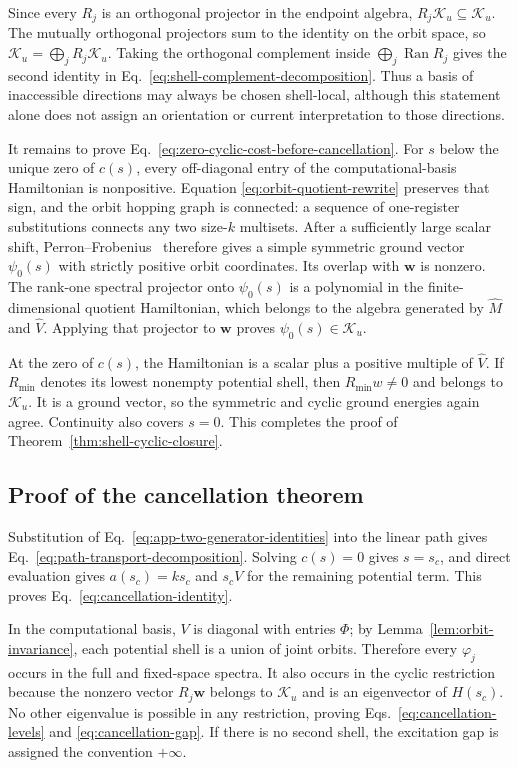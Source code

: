 Since every $R_j$ is an orthogonal projector in the endpoint algebra,
$R_j\mathcal K_u\subseteq\mathcal K_u$.  The mutually orthogonal projectors
sum to the identity on the orbit space, so
$\mathcal K_u=\bigoplus_jR_j\mathcal K_u$.  Taking the orthogonal complement
inside $\bigoplus_j\operatorname{Ran}R_j$ gives the second identity in
Eq.~\eqref{eq:shell-complement-decomposition}.  Thus a basis of inaccessible
directions may always be chosen shell-local, although this statement alone
does not assign an orientation or current interpretation to those
directions.

It remains to prove Eq.~\eqref{eq:zero-cyclic-cost-before-cancellation}.
For $s$ below the unique zero of $c(s)$, every off-diagonal entry of the
computational-basis Hamiltonian is nonpositive.  Equation
\eqref{eq:orbit-quotient-rewrite} preserves that sign, and the orbit hopping
graph is connected: a sequence of one-register substitutions connects any
two size-$k$ multisets.  After a sufficiently large scalar shift,
Perron--Frobenius~\cite{HornJohnson2012} therefore gives a simple symmetric
ground vector $\psi_0(s)$ with strictly positive orbit coordinates.  Its
overlap with $\boldsymbol w$ is nonzero.  The rank-one spectral projector onto
$\psi_0(s)$ is a polynomial in the finite-dimensional quotient Hamiltonian,
which belongs to the algebra generated by $\widehat M$ and $\widehat V$.
Applying that projector to $\boldsymbol w$ proves
$\psi_0(s)\in\mathcal K_u$.

At the zero of $c(s)$, the Hamiltonian is a scalar plus a positive multiple
of $\widehat V$.  If $R_{\min}$ denotes its lowest nonempty potential shell,
then $R_{\min}w\ne0$ and belongs to $\mathcal K_u$.  It is a ground vector,
so the symmetric and cyclic ground energies again agree.  Continuity also
covers $s=0$.  This completes the proof of
Theorem~\ref{thm:shell-cyclic-closure}.

\subsection{Proof of the cancellation theorem}

Substitution of Eq.~\eqref{eq:app-two-generator-identities} into the linear
path gives Eq.~\eqref{eq:path-transport-decomposition}.  Solving $c(s)=0$
gives $s=s_c$, and direct evaluation gives $a(s_c)=ks_c$ and
$s_cV$ for the remaining potential term.  This proves
Eq.~\eqref{eq:cancellation-identity}.

In the computational basis, $V$ is diagonal with entries $\Phi$; by
Lemma~\ref{lem:orbit-invariance}, each potential shell is a union of joint
orbits.  Therefore every $\varphi_j$ occurs in the full and fixed-space
spectra.  It also occurs in the cyclic restriction because the nonzero
vector $R_j\boldsymbol w$ belongs to $\mathcal K_u$ and is an eigenvector of
$H(s_c)$.  No other eigenvalue is possible in any restriction, proving
Eqs.~\eqref{eq:cancellation-levels} and
\eqref{eq:cancellation-gap}.  If there is no second shell, the excitation
gap is assigned the convention $+\infty$.

